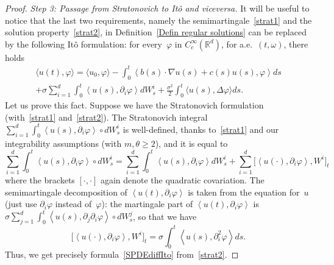 \documentclass[a4paper,10pt]{article}
\newcommand\1{\mathbbm{1}}
\newcommand{\lan}{\langle}
\newcommand{\ran}{\rangle}
\numberwithin{equation}{section}
\begin{document}
\begin{proof}
\emph{Step 3: Passage from Stratonovich to It\^o and viceversa.} It will be useful to notice that the last two requirements, namely the semimartingale~\ref{strat1} and the solution property~\ref{strat2}, in Definition~\ref{Defin regular solutions} can be replaced by the following It\^o formulation: for every~$\varphi$ in $C_{c}^{\infty}(\mathbb{R}^{d})$, for a.e.~$(t,\omega)$, there holds
\begin{multline}
\langle u(t),\varphi\rangle=\langle u_{0},\varphi\rangle -\int_{0}^{t}\left\langle b(s) \cdot\nabla u(s) + c(s) u(s),\varphi\right\rangle ds \\
  +\sigma \sum_{i=1}^{d}\int_{0}^{t}\left\langle u(s),\partial_{i} \varphi\right\rangle dW_{s}^{i} +\frac{\sigma^2}{2} \int_{0}^{t} \lan u(s),\Delta\varphi\ran ds .\label{SPDEdiffIto}
\end{multline}
Let us prove this fact. Suppose we have the Stratonovich formulation (with~\ref{strat1} and~\ref{strat2}). The Stratono\-vich integral $\sum_{i=1}^{d}\int_{0}^{t}\left\langle u(  s)  ,\partial_{i}\varphi\right\rangle \circ dW_{s}^{i}$ is well-defined, thanks to~\ref{strat1} and our integrability assumptions (with $m,\theta\ge2$), and it is equal to
\begin{equation*}
\sum_{i=1}^{d}\int_{0}^{t}\left\langle u(s) ,\partial_{i}\varphi\right\rangle \circ dW_{s}^{i}=\sum_{i=1}^{d}\int_{0}^{t}\left\langle u(  s)  ,\partial_{i}\varphi \right\rangle dW_{s}^{i}+\sum_{i=1}^{d}\big[  \left\langle u(\cdot),\partial_{i}\varphi\right\rangle ,W^{i}\big]_{t} 
\end{equation*}
where the brackets $[\cdot,\cdot]$ again denote the quadratic covariation. The semimartingale decomposition of $\left\langle u(t),\partial_{i}\varphi\right\rangle $ is taken from the equation for~$u$ (just use $\partial_i\varphi$ instead of~$\varphi$): the martingale part of $\left\langle u(t),\partial_{i}\varphi\right\rangle $ is $\sigma\sum_{j=1}^{d}\int_{0}^{t}\left\langle u(s),\partial_{j}\partial_{i}\varphi\right\rangle \circ dW_{s}^{j}$, so that we have
\begin{equation}
\label{ito-strato-corrector}
\big[\left\langle u(\cdot),\partial_{i} \varphi\right\rangle ,W^{i} \big]_{t} = \sigma\int_{0}^{t} \left\langle
u(  s) ,\partial_{i}^{2}\varphi\right\rangle ds .
\end{equation}
Thus, we get precisely formula~\eqref{SPDEdiffIto} from~\ref{strat2}.


\end{proof}
\end{document}
